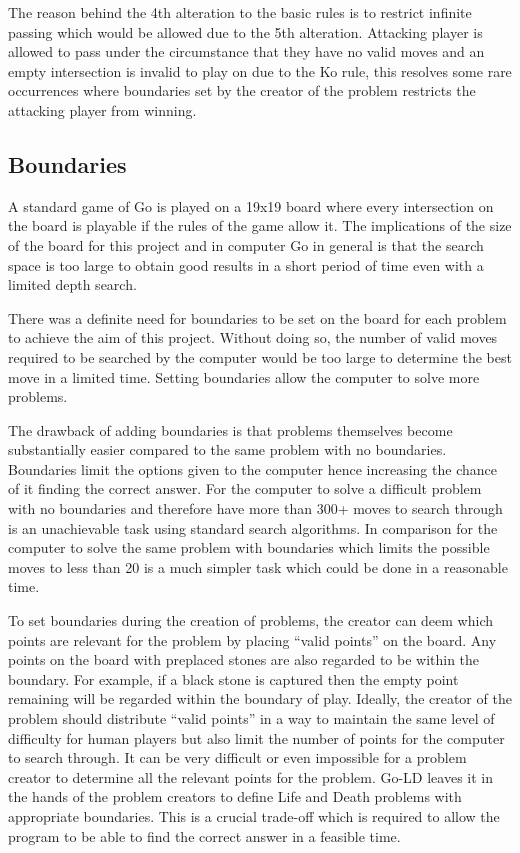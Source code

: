 \documentclass{l4proj}
\begin{document}
\bigskip
The reason behind the 4th alteration to the basic rules is to restrict infinite passing which would be allowed due to the 5th alteration. Attacking player is allowed to pass under the circumstance that they have no valid moves and an empty intersection is invalid to play on due to the Ko rule, this resolves some rare occurrences where boundaries set by the creator of the problem restricts the attacking player from winning.

\subsection{Boundaries}
A standard game of Go is played on a 19x19 board where every intersection on the board is playable if the rules of the game allow it. The implications of the size of the board for this project and in computer Go in general is that the search space is too large to obtain good results in a short period of time even with a limited depth search.

There was a definite need for boundaries to be set on the board for each problem to achieve the aim of this project. Without doing so, the number of valid moves required to be searched by the computer would be too large to determine the best move in a limited time. Setting boundaries allow the computer to solve more problems.

The drawback of adding boundaries is that problems themselves become substantially easier compared to the same problem with no boundaries. Boundaries limit the options given to the computer hence increasing the chance of it finding the correct answer. For the computer to solve a difficult problem with no boundaries and therefore have more than 300+ moves to search through is an unachievable task using standard search algorithms. In comparison for the computer to solve the same problem with boundaries which limits the possible moves to less than 20 is a much simpler task which could be done in a reasonable time.

To set boundaries during the creation of problems, the creator can deem which points are relevant for the problem by placing “valid points” on the board. Any points on the board with preplaced stones are also regarded to be within the boundary. For example, if a black stone is captured then the empty point remaining will be regarded within the boundary of play. Ideally, the creator of the problem should distribute “valid points” in a way to maintain the same level of difficulty for human players but also limit the number of points for the computer to search through. It can be very difficult or even impossible for a problem creator to determine all the relevant points for the problem. Go-LD leaves it in the hands of the problem creators to define Life and Death problems with appropriate boundaries. This is a crucial trade-off which is required to allow the program to be able to find the correct answer in a feasible time.
\end{document}
